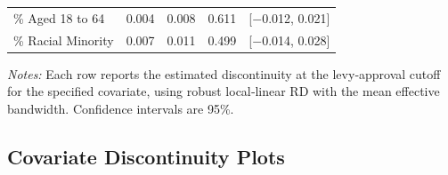 \begin{table}[!h]
\begin{tabularx}{\textwidth}{p{5cm}rccc}
        \% Aged 18 to 64                              &   0.004  & 0.008 & 0.611 & [$-$0.012, 0.021] \\
        \% Racial Minority                            &   0.007  & 0.011 & 0.499 & [$-$0.014, 0.028] \\
        \hline
    \end{tabularx}
    \begin{tablenotes}[flushleft]
        \small
        \item \textit{Notes:} Each row reports the estimated discontinuity at the levy‐approval cutoff for the specified covariate, using robust local‐linear RD with the mean effective bandwidth. Confidence intervals are 95\%.
    \end{tablenotes}
\end{table}


\subsection{Covariate Discontinuity Plots}



